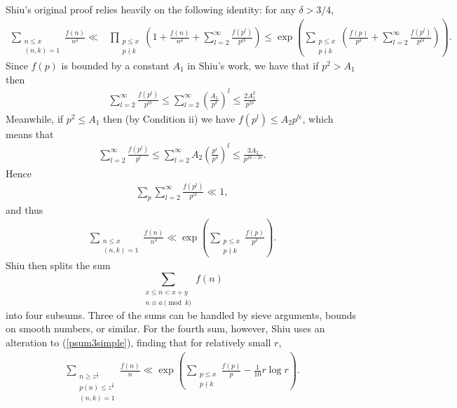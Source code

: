 \documentclass{amsart}
\begin{document}
Shiu's original proof relies heavily on the following identity: for any $\delta>3/4$,
\begin{align*}
\sum_{\substack{n\leq x \\ (n,k)=1}}\frac{f(n)}{n^\delta}\ll &\prod_{\substack{p\leq x \\ p\nmid k}}\left(1+\frac{f(n)}{n^\delta}+\sum_{l=2}^\infty \frac{f(p^l)}{p^{l\delta}}\right)\leq \exp\left(\sum_{\substack{p\leq x \\ p\nmid k}}\left(\frac{f(p)}{p^\delta}+\sum_{l=2}^\infty \frac{f(p^l)}{p^{l\delta}}\right)\right).
\end{align*}
Since $f(p)$ is bounded by a constant $A_1$ in Shiu's work, we have that if $p^2>A_1$ then
\begin{gather}\label{psum}\sum_{l=2}^\infty \frac{f(p^l)}{p^{l\delta}}\leq \sum_{l=2}^\infty \left(\frac{A_1}{p^\delta}\right)^l\leq \frac{2A_1^2}{p^{2\delta}}\end{gather}
Meanwhile, if $p^2\leq A_1$ then (by Condition ii) we have $f(p^l)\leq A_2p^{l\epsilon}$, which means that 
\begin{gather}\label{psum2}\sum_{l=2}^\infty \frac{f(p^l)}{p^l}\leq \sum_{l=2}^\infty A_2\left(\frac{p^\epsilon}{p^\delta}\right)^l\leq \frac{3A_2}{p^{2\delta-2\epsilon}}.\end{gather}
Hence 
\begin{gather}\label{psum3}
\sum_p \sum_{l=2}^\infty \frac{f(p^l)}{p^{l\delta}}\ll 1,
\end{gather}
and thus
\begin{align}\label{psum3simple}
\sum_{\substack{n\leq x \\ (n,k)=1}}\frac{f(n)}{n^\delta}\ll \exp\left(\sum_{\substack{p\leq x \\ p\nmid k}}\frac{f(p)}{p^\delta}\right).
\end{align}
Shiu then splits the sum 
$$\sum_{\substack{x\leq n<x+y \\ n\equiv a\pmod k}}f(n)$$
into four subsums.  Three of the sums can be handled by sieve arguments, bounds on smooth numbers, or similar.  For the fourth sum, however, Shiu uses an alteration to (\ref{psum3simple}), finding that for relatively small $r$,
\begin{align}\label{Lemma3}
\sum_{\substack{n\geq z^\frac 12 \\ p(n)\leq z^\frac 1r \\ (n,k)=1}}\frac{f(n)}{n}\ll \exp\left(\sum_{\substack{p\leq x \\ p\nmid k}}\frac{f(p)}{p}-\frac{1}{10}r\log r\right).
\end{align}
\end{document}
